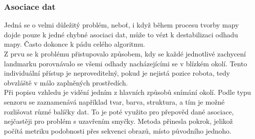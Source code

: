 \documentclass[12pt]{report}
\begin{document}
\subsubsection{Asociace dat}
Jedná se o velmi důležitý problém, neboť, i když během procesu tvorby mapy dojde pouze k jedné chybné asociaci dat, může to vézt k destabilizaci odhadu mapy. Často dokonce k pádu celého algoritmu.\\
\indent Z prvu se k problému přistupovalo způsobem, kdy se každé jednotlivé zachycení landmarku porovnávalo se všemi odhady nacházejícími se v blízkém okolí. Tento individuální přístup je neproveditelný, pokud je nejistá pozice robota, tedy obvzláště v málo zaplněných prostředích. \\
\indent Při popisu vzhledu je vidění jedním z hlavních způsobů snímání okolí. Podle typu senzoru se zaznamenává například tvar, barva, struktura, a tím je možné rozlišovat různé balíčky dat. To je poté využito pro přepověd dané asociace, nejčastěji pro problém s uzavřením smyčky. Metoda přinesla pokrok, jelikož počítá metriku podobnosti přes sekvenci obrazů, místo původního jednoho.\\

\newpage
\end{document}
